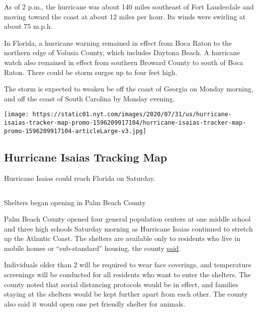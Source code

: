 As of 2 p.m., the hurricane was about 140 miles southeast of Fort
Lauderdale and moving toward the coast at about 12 miles per hour. Its
winds were swirling at about 75 m.p.h.

In Florida, a hurricane warning remained in effect from Boca Raton to
the northern edge of Volusia County, which includes Daytona Beach. A
hurricane watch also remained in effect from southern Broward County to
south of Boca Raton. There could be storm surges up to four feet high.

The storm is expected to weaken be off the coast of Georgia on Monday
morning, and off the coast of South Carolina by Monday evening.

\href{https://www.nytimes.com/interactive/2020/07/31/us/hurricane-isaias-tracker-map.html}{}

\texttt{[image: https://static01.nyt.com/images/2020/07/31/us/hurricane-isaias-tracker-map-promo-1596209917104/hurricane-isaias-tracker-map-promo-1596209917104-articleLarge-v3.jpg]}

\hypertarget{hurricane-isaias-tracking-map}{%
\subsection{Hurricane Isaias Tracking
Map}\label{hurricane-isaias-tracking-map}}

Hurricane Isaias could reach Florida on Saturday.

\hypertarget{-1}{%
\subsection{}\label{-1}}

Shelters began opening in Palm Beach County

Palm Beach County opened four general population centers at one middle
school and three high schools Saturday morning as Hurricane Isaias
continued to stretch up the Atlantic Coast. The shelters are available
only to residents who live in mobile homes or ``sub-standard'' housing,
the county
\href{https://discover.pbcgov.org/Lists/Newsroom/NewsDispForm.aspx?ID=3014}{said}.

Individuals older than 2 will be required to wear face coverings, and
temperature screenings will be conducted for all residents who want to
enter the shelters. The county noted that social distancing protocols
would be in effect, and families staying at the shelters would be kept
further apart from each other. The county also said it would open one
pet friendly shelter for animals.

